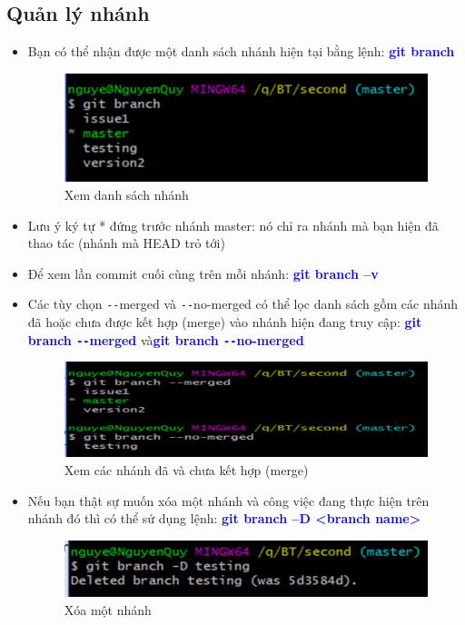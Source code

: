 \documentclass[12pt,a4paper]{report}
\begin{document}
\subsection{Quản lý nhánh}
\begin{itemize}
\item Bạn có thể nhận được một danh sách nhánh hiện tại bằng lệnh: \textcolor{blue}{\bf git branch}

\begin{figure}[!ht]
	\centering
	\includegraphics[width=0.8\linewidth]{screenshot055}
	\caption{Xem danh sách nhánh}
	\label{fig:screenshot055}
\end{figure}

\item Lưu ý ký tự * đứng trước nhánh master: nó chỉ ra nhánh mà bạn hiện đã thao tác (nhánh mà HEAD trỏ tới)
\item Để xem lần commit cuối cùng trên mỗi nhánh: \textcolor{blue}{\bf git branch –v}
\item Các tùy chọn \texttt{-{}-}merged và \texttt{-{}-}no-merged có thể lọc danh sách gồm các nhánh đã hoặc chưa được kết hợp (merge) vào nhánh hiện đang truy cập: \textcolor{blue}{\bf git branch \texttt{-{}-}merged} và\textcolor{blue}{\bf git branch \texttt{-{}-}no-merged}

\begin{figure}[!ht]
	\centering
	\includegraphics[width=0.8\linewidth]{screenshot056}
\caption{Xem các nhánh đã và chưa kết hợp (merge)}
	\label{fig:screenshot056}
\end{figure}

\item Nếu bạn thật sự muốn xóa một nhánh và công việc đang thực hiện trên nhánh đó thì có thể sử dụng lệnh: \textcolor{blue}{\bf git branch –D <branch name>}

\begin{figure}[!ht]
	\centering
	\includegraphics[width=0.8\linewidth]{screenshot057}
\caption{Xóa một nhánh}
	\label{fig:screenshot057}
\end{figure}

\end{itemize}
\end{document}
